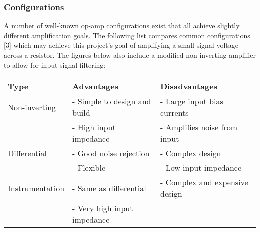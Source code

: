 \subsubsection{Configurations}\label{sec:opamps_configs}
A number of well-known op-amp configurations exist that all achieve slightly different amplification goals. The following list compares common configurations [3] which may achieve this project's goal
of amplifying a small-signal voltage across a resistor. The figures below also include a modified non-inverting amplifier to allow for input signal filtering:
\begin{center}

    \begin{tabular}{|p{3.5cm}|p{6cm}|p{6cm}|}
        \hline
        Type            & Advantages
                               & Disadvantages                               \\
        \hline
        Non-inverting   & - Simple to design and build                    & - Large input bias currents                 \\
                        & - High input impedance                          & - Amplifies noise from input                \\
        \hline
        Differential    & - Good noise rejection                          & - Complex design                            \\
                        & - Flexible                                      & - Low input impedance                       \\
        \hline
        Instrumentation & - Same as differential                          & - Complex and expensive design              \\
                        & - Very high input impedance                     &                                             \\
        \hline
    \end{tabular}
\end{center}

